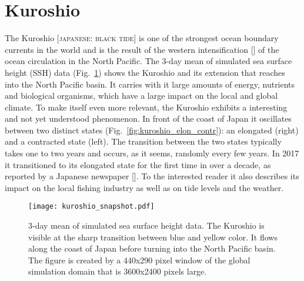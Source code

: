 \newpage
\section{Kuroshio}%
\label{sec:kuroshio}

The Kuroshio [\textsc{japanese: black tide}] is one of the strongest ocean
boundary currents in the world and is the result of the western intensification
[\cite{pedlosky2013ocean}] of the ocean circulation in the North Pacific. The
3-day mean of simulated sea surface height (SSH) data
(Fig.~\ref{fig:kuroshio_snapshot}) shows the Kuroshio and its extension that
reaches into the North Pacific basin. It carries with it large amounts of
energy, nutrients and biological organisms, which have a large impact on the
local and global climate. To make itself even more relevant, the Kuroshio
exhibits a interesting and not yet understood phenomenon. In front of the coast
of Japan it oscillates between two distinct states
(Fig.~\ref{fig:kuroshio_elon_contr}): an elongated (right) and a contracted
state (left).  The transition between the two states typically takes one to two
years and occurs, as it seems, randomly every few years.  In 2017 it
transitioned to its elongated state for the first time in over a decade, as
reported by a Japanese newspaper [\cite{mainichi}]. To the interested reader it
also describes its impact on the local fishing industry as well as on tide
levels and the weather.

\begin{figure}
  \centering
  \texttt{[image: kuroshio\_snapshot.pdf]}
  \caption{3-day mean of simulated sea surface height data. The Kuroshio is
  visible at the sharp transition between blue and yellow color. It flows along
  the coast of Japan before turning into the North Pacific basin. The figure is
  created by a 440x290 pixel window of the global simulation domain that is
  3600x2400 pixels large.}
  \label{fig:kuroshio_snapshot}
\end{figure}

